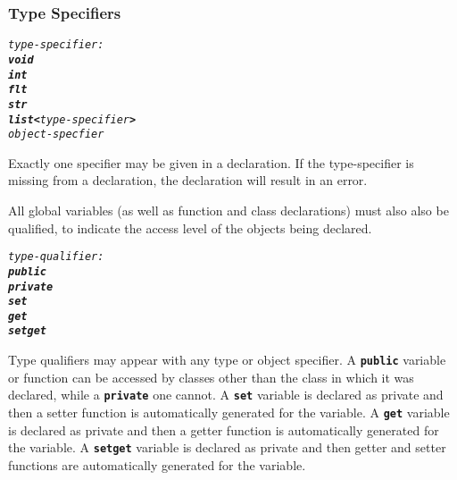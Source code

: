 \documentclass[12pt]{report}
\begin{document}
\subsubsection{Type Specifiers}
\begin{alltt}
         \textit{type-specifier:}
              \textit{\textbf{void}}
              \textit{\textbf{int}}
              \textit{\textbf{flt}}
              \textit{\textbf{str}}
              \textit{\textbf{list<}type-specifier\textbf{>}}
              \textit{object-specfier}
\end{alltt}
\begin{doublespace}

Exactly one specifier may be given in a declaration. If the type-specifier is missing from a declaration, the declaration will result in an error.

All global variables (as well as function and class declarations) must also also be qualified, to indicate the access level of the objects being declared.
\end{doublespace}
\begin{alltt}
         \textit{type-qualifier:}
              \textit{\textbf{public}}
              \textit{\textbf{private}}
              \textit{\textbf{set}}
              \textit{\textbf{get}}
              \textit{\textbf{setget}}
\end{alltt}
\begin{doublespace}

Type qualifiers may appear with any type or object specifier. A \textbf{\texttt{public}} variable or function can be accessed by classes other than the class in which it was declared, while a \textbf{\texttt{private}} one cannot. A \textbf{\texttt{set}} variable is declared as private and then a setter function is automatically generated for the variable. A \textbf{\texttt{get}} variable is declared as private and then a getter function is automatically generated for the variable. A \textbf{\texttt{setget}} variable is declared as private and then getter and setter functions are automatically generated for the variable.
\end{doublespace}
\end{document}
